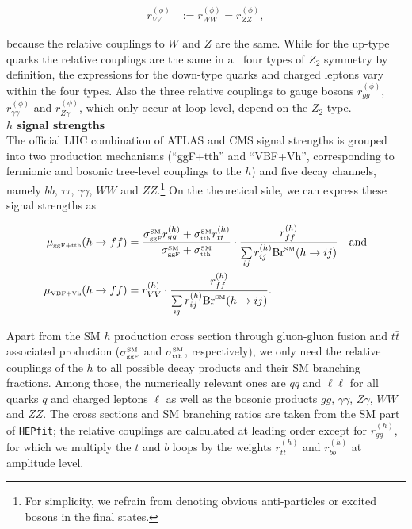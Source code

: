 \documentclass[preprint,3p,12pt]{elsarticle}
\newcommand{\HEPfit}{\texttt{HEPfit}\xspace}
\begin{document}
\begin{align}
 r_{VV}^{(\phi)}&:=r_{WW}^{(\phi)}=r_{ZZ}^{(\phi)}, \nonumber
\end{align}

because the relative couplings to $W$ and $Z$ are the same. While for the up-type quarks the relative couplings are the same in all four types of $Z_2$ symmetry by definition, the expressions for the down-type quarks and charged leptons vary within the four types. Also the three relative couplings to gauge bosons $r_{gg}^{(\phi)}$, $r_{\gamma \gamma}^{(\phi)}$ and $r_{Z\gamma}^{(\phi)}$, which only occur at loop level, depend on the $Z_2$ type.\\

\textbf{$h$ signal strengths}\\

The official LHC combination of ATLAS and CMS signal strengths is grouped into two production mechanisms (``ggF+tth'' and ``VBF+Vh'', corresponding to fermionic and bosonic tree-level couplings to the $h$) and five decay channels, namely $bb$, $\tau \tau$, $\gamma \gamma$, $WW$ and $ZZ$.\footnote{For simplicity, we refrain from denoting obvious anti-particles or excited bosons in the final states.}
On the theoretical side, we can express these signal strengths as

\begin{align}
 \mu_{\text{\tiny{ggF+tth}}}(h\to ff) &= \frac{\sigma^{\text{\tiny{SM}}}_{\text{\tiny{ggF}}} r_{gg}^{(h)} + \sigma^{\text{\tiny{SM}}}_{\text{\tiny{tth}}} r_{tt}^{(h)}}{\sigma^{\text{\tiny{SM}}}_{\text{\tiny{ggF}}} + \sigma^{\text{\tiny{SM}}}_{\text{\tiny{tth}}}} \cdot \frac{r_{ff}^{(h)}}{\sum\limits_{ij} r_{ij}^{(h)} {\rm Br}^{\text{\tiny{SM}}} (h\to ij)} \quad \text{and}  \nonumber\\
 \mu_{\text{\tiny{VBF+Vh}}}(h\to ff) &= r_{VV}^{(h)} \cdot \frac{r_{ff}^{(h)}}{\sum\limits_{ij} r_{ij}^{(h)} {\rm Br}^{\text{\tiny{SM}}} (h\to ij)}. \nonumber
\end{align}

Apart from the SM $h$ production cross section through gluon-gluon fusion and $t\bar{t}$ associated production ($\sigma^{\text{\tiny{SM}}}_{\text{\tiny{ggF}}}$ and $\sigma^{\text{\tiny{SM}}}_{\text{\tiny{tth}}}$, respectively), we only need the relative couplings of the $h$ to all possible decay products and their SM branching fractions.
Among those, the numerically relevant ones are $qq$ and $\ell \ell$ for all quarks $q$ and charged leptons $\ell$ as well as the bosonic products $gg$, $\gamma \gamma$, $Z \gamma$, $WW$ and $ZZ$. The cross sections and SM branching ratios are taken from the SM part of \HEPfit; the relative couplings are calculated at leading order except for $r_{gg}^{(h)}$, for which we multiply the $t$ and $b$ loops by the weights $r_{tt}^{(h)}$ and $r_{bb}^{(h)}$ at amplitude level.
\end{document}
